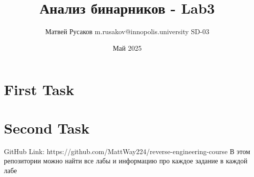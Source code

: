 \usepackage{hyperref}
\usepackage[utf8]{inputenc}
\usepackage[T2A]{fontenc}
\usepackage[top=5cm,bottom=3cm,right=3cm,left=3cm]{geometry}
\usepackage{graphicx}

\title{Анализ бинарников - Lab3}
\author{Матвей Русаков m.rusakov@innopolis.university SD-03}
\date{Май 2025}



    \maketitle
    \section{First Task}
    

    \section{Second Task}
    

    \begin{thebibliography}{1}
        GitHub Link: https://github.com/MattWay224/reverse-engineering-course
        В этом репозитории можно найти все лабы и информацию про каждое задание в каждой лабе
    \end{thebibliography}

